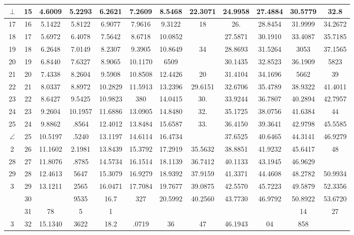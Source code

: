 \documentclass[10pt]{article}
\begin{document}
\begin{CJK*}{UTF8}{bsmi}
\begin{center}
\begin{tabular}{|c|c|c|c|c|c|c|c|c|c|c|c|}
\hline
$\perp$ & 15 & 4.6009 & 5.2293 & 6.2621 & 7.2609 & 8.5468 & 22.3071 & 24.9958 & 27.4884 & 30.5779 & 32.8 \\
\hline
17 & 16 & 5.1422 & 5.8122 & 6.9077 & 7.9616 & 9.3122 & 18 & 26. & 28.8454 & 31.9999 & 34.2672 \\
\hline
18 & 17 & 5.6972 & 6.4078 & 7.5642 & 8.6718 & 10.0852 &  & 27.5871 & 30.1910 & 33.4087 & 35.7185 \\
\hline
19 & 18 & 6.2648 & 7.0149 & 8.2307 & 9.3905 & 10.8649 & 34 & 28.8693 & 31.5264 & 3053 & 37.1565 \\
\hline
20 & 19 & 6.8440 & 7.6327 & 8.9065 & 10.1170 & 6509 &  & 30.1435 & 32.8523 & 36.1909 & 5823 \\
\hline
21 & 20 & 7.4338 & 8.2604 & 9.5908 & 10.8508 & 12.4426 & 20 & 31.4104 & 34.1696 & 5662 & 39 \\
\hline
22 & 21 & 8.0337 & 8.8972 & 10.2829 & 11.5913 & 13.2396 & 29.6151 & 32.6706 & 35.4789 & 38.9322 & 41.4011 \\
\hline
23 & 22 & 8.6427 & 9.5425 & 10.9823 & 380 & 14.0415 & 30. & 33.9244 & 36.7807 & 40.2894 & 42.7957 \\
\hline
24 & 23 & 9.2604 & 10.1957 & 11.6886 & 13.0905 & 14.8480 & 32. & 35.1725 & 38.0756 & 41.6384 & 44 \\
\hline
25 & 24 & 9.8862 & .8564 & 12.4012 & 13.8484 & 15.6587 & 33. & 36.4150 & 39.3641 & 42.9798 & 45.5585 \\
\hline
$\angle$ & 25 & 10.5197 & .5240 & 13.1197 & 14.6114 & 16.4734 &  & 37.6525 & 40.6465 & 44.3141 & 46.9279 \\
\hline
2 & 26 & 11.1602 & 2.1981 & 13.8439 & 15.3792 & 17.2919 & 35.5632 & 38.8851 & 41.9232 & 45.6417 & 48 \\
\hline
28 & 27 & 11.8076 & .8785 & 14.5734 & 16.1514 & 18.1139 & 36.7412 & 40.1133 & 43.1945 & 46.9629 &  \\
\hline
29 & 28 & 12.4613 & 5647 & 15.3079 & 16.9279 & 18.9392 & 37.9159 & 41.3371 & 44.4608 & 48.2782 & 50.9934 \\
\hline
3 & 29 & 13.1211 & 2565 & 16.0471 & 17.7084 & 19.7677 & 39.0875 & 42.5570 & 45.7223 & 49.5879 & 52.3356 \\
\hline
 & 30 &  & 9535 & 16.7 & 327 & 20.5992 & 40.2560 & 43.7730 & 46.9792 & 50.8922 & 53.6720 \\
\hline
 & 31 & 78 & 5 & 1 &  &  &  &  &  & 14 & 27 \\
\hline
3 & 32 & 15.1340 & 3622 & 18.2 & .0719 & 36 & 47 & 46.1943 & 04 & 858 &  \\
\hline

\end{tabular}
\end{center}
\end{CJK*}
\end{document}
